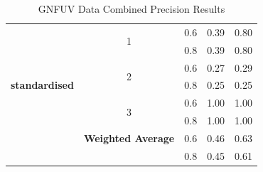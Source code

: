 \documentclass{mpaper}
\begin{document}
\begin{table}[]
\begin{tabular}{|c|cccc|}
                            & \multicolumn{1}{c|}{\multirow{2}{*}{1}}        & \multicolumn{1}{c|}{0.6}                & 0.39             & 0.80              \\
                            & \multicolumn{1}{c|}{}                          & \multicolumn{1}{c|}{0.8}                & 0.39             & 0.80              \\ \cline{2-5} 
                            & \multicolumn{1}{c|}{\multirow{2}{*}{2}}        & \multicolumn{1}{c|}{0.6}                & 0.27             & 0.29              \\
\textbf{standardised}       & \multicolumn{1}{c|}{}                          & \multicolumn{1}{c|}{0.8}                & 0.25             & 0.25              \\ \cline{2-5} 
                            & \multicolumn{1}{c|}{\multirow{2}{*}{3}}        & \multicolumn{1}{c|}{0.6}                & 1.00             & 1.00              \\
                            & \multicolumn{1}{c|}{}                          & \multicolumn{1}{c|}{0.8}                & 1.00             & 1.00              \\ \cline{2-5} 
                            & \multicolumn{1}{c|}{\textbf{Weighted Average}} & \multicolumn{1}{c|}{0.6}                & 0.46             & 0.63              \\
                            & \multicolumn{1}{c|}{}                          & \multicolumn{1}{c|}{0.8}                & 0.45             & 0.61              \\ \hline
\end{tabular}
\caption{\label{tab:gnfuv_results} GNFUV Data Combined Precision Results}
\end{table}
\end{document}
